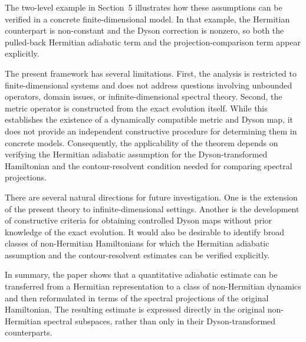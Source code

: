 \documentclass[pdflatex,sn-mathphys-num]{sn-jnl}
\theoremstyle{thmstyleone}
\theoremstyle{thmstyletwo}
\theoremstyle{thmstylethree}
\begin{document}
The two-level example in Section~5 illustrates how these assumptions can be
verified in a concrete finite-dimensional model. In that example, the Hermitian counterpart is non-constant and the Dyson correction is nonzero, so both the
pulled-back Hermitian adiabatic term and the projection-comparison term appear
explicitly.

The present framework has several limitations. First, the analysis is restricted
to finite-dimensional systems and does not address questions involving unbounded
operators, domain issues, or infinite-dimensional spectral theory. Second, the
metric operator is constructed from the exact evolution itself. While this
establishes the existence of a dynamically compatible metric and Dyson map, it
does not provide an independent constructive procedure for determining them in
concrete models. Consequently, the applicability of the theorem depends on
verifying the Hermitian adiabatic assumption for the Dyson-transformed
Hamiltonian and the contour-resolvent condition needed for comparing spectral
projections.

There are several natural directions for future investigation. One is the
extension of the present theory to infinite-dimensional settings. Another is the
development of constructive criteria for obtaining controlled Dyson maps without
prior knowledge of the exact evolution. It would also be desirable to identify
broad classes of non-Hermitian Hamiltonians for which the Hermitian adiabatic
assumption and the contour-resolvent estimates can be verified explicitly.

In summary, the paper shows that a quantitative adiabatic estimate can be
transferred from a Hermitian representation to a class of non-Hermitian dynamics
and then reformulated in terms of the spectral projections of the original
Hamiltonian. The resulting estimate is expressed directly in the original
non-Hermitian spectral subspaces, rather than only in their Dyson-transformed
counterparts.


\end{document}

